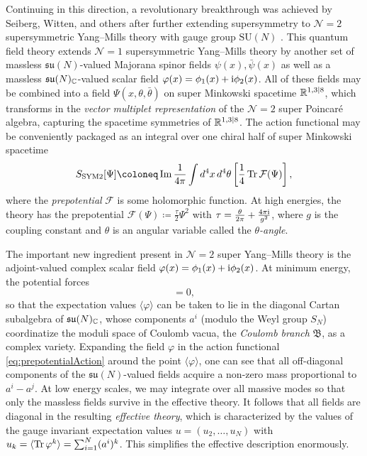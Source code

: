 Continuing in this direction, a revolutionary breakthrough was achieved by Seiberg, Witten, and others after further extending supersymmetry to $\mathcal{N}=2$ supersymmetric Yang--Mills theory with gauge group $\mathrm{SU}(N)$ \cite{seiberg_monopole_1994,seiberg_monopoles_1994,gorsky_integrability_1995,martinec_integrable_1996,donagi_supersymmetric_1996,dhoker_calogero-moser_1998}. This quantum field theory extends $\mathcal{N}=1$ supersymmetric Yang--Mills theory by another set of massless $\mathfrak{su}(N)$-valued Majorana spinor fields $\psi(x),\bar \psi(x)$ as well as a massless $\mathfrak{su}(N)_{\mathbb{C}}$-valued scalar field $\varphi(x) = \phi_1(x) + \mathrm{i} \phi_2(x)$. All of these fields may be combined into a field $\Psi(x,\theta,\bar \theta)$ on super Minkowski spacetime $\mathbb{R}^{1,3|8}$, which transforms in the \emph{vector multiplet representation} of the $\mathcal{N}=2$ super Poincaré algebra, capturing the spacetime symmetries of $\mathbb{R}^{1,3|8}$. The action functional may be conveniently packaged as an integral over one chiral half of super Minkowski spacetime
\begin{equation}\label{eq:prepotentialAction}
	S_{\text{SYM2}}[\Psi] \coloneq \operatorname{Im} \frac{1}{4\pi} \int d^4 x \, d^4 \theta \left[ \frac{1}{4} \Tr \mathcal{F}(\Psi) \right],
\end{equation}
where the \emph{prepotential} $\mathcal{F}$ is some holomorphic function. At high energies, the theory has the prepotential $\mathcal{F}(\Psi) \coloneq \frac{\tau}{2} \Psi^2$ with $\tau = \frac{\theta}{2\pi} + \frac{4\pi\mathrm{i}}{g^2}$, where $g$ is the coupling constant and $\theta$ is an angular variable called the \emph{$\theta$-angle}.

The important new ingredient present in $\mathcal{N}=2$ super Yang--Mills theory is the adjoint-valued complex scalar field $\varphi(x) = \phi_1(x) + \mathrm{i} \phi_2(x)$. At minimum energy, the potential forces
\begin{equation}
	[\phi_1(x),\phi_2(x)] = 0,
\end{equation}
so that the expectation values $\langle \varphi \rangle$ can be taken to lie in the diagonal Cartan subalgebra of $\mathfrak{su}(N)_{\mathbb{C}}$, whose components $a^i$ (modulo the Weyl group $S_N$) coordinatize the moduli space of Coulomb vacua, the \emph{Coulomb branch} $\mathfrak{B}$, as a complex variety. Expanding the field $\varphi$ in the action functional \eqref{eq:prepotentialAction} around the point $\langle \varphi \rangle$, one can see that all off-diagonal components of the $\mathfrak{su}(N)$-valued fields acquire a non-zero mass proportional to $a^i-a^j$. At low energy scales, we may integrate over all massive modes so that only the massless fields survive in the effective theory. It follows that all fields are diagonal in the resulting \emph{effective theory}, which is characterized by the values of the gauge invariant expectation values $u = (u_2,\dots,u_N)$ with $u_k = \langle \operatorname{Tr} \varphi^k \rangle = \sum_{i=1}^N (a^i)^k$. This simplifies the effective description enormously.

